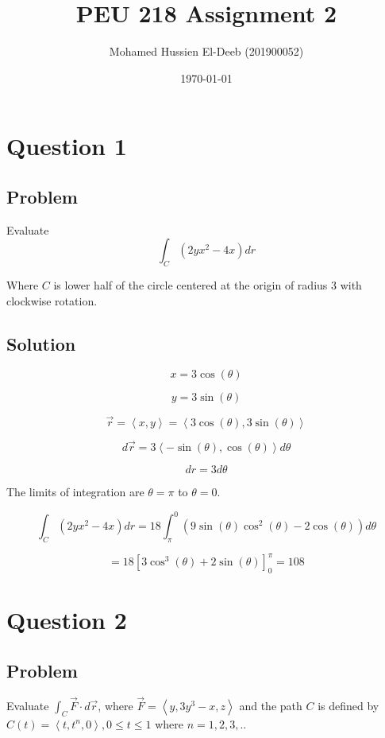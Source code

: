 \documentclass[12pt]{article}
\title{PEU 218 Assignment 2}
\author{Mohamed Hussien El-Deeb (201900052)}
\date{\today}
\begin{document}
\maketitle
\tableofcontents
\hypersetup{linkcolor=RoyalBlue4}

\newpage
\section{Question 1}

\subsection{Problem}

Evaluate
\[
    \int_C \left(2y x^2 - 4x\right) d r
\]

Where \(C\) is lower half of the circle centered at the origin of radius 3 with clockwise
rotation.

\subsection{Solution}

\[x = 3 \cos(\theta)\]

\[y = 3 \sin(\theta)\]

\[
    \vec{r} = \left\langle x, y\right\rangle =
    \left\langle 3 \cos(\theta), 3 \sin(\theta)\right\rangle
\]

\[
    d \vec{r} = 3 \left\langle -\sin(\theta), \cos(\theta)\right\rangle d\theta
\]

\[
    d r = 3 d \theta
\]



The limits of integration are \(\theta = \pi \) to \(\theta = 0\).

\[
    \int_C \left(2y x^2 - 4x\right) d r
    = 18 \int_{\pi}^{0} \left(9 \sin(\theta) \cos^2(\theta) - 2 \cos(\theta)\right) d \theta
\]

\[
    = 18 {\left[3 \cos^3(\theta) + 2 \sin(\theta)\right]}_{0}^{\pi}
    = 108
\]

\newpage
\section{Question 2}

\subsection{Problem}

Evaluate \(\int_C \vec{F} \cdot d \vec{r}\), where
\(\vec{F}=\left\langle y, 3y^3 - x, z\right\rangle \) and the path \(C\) is defined by
\(C(t) = \left\langle t, t^n, 0\right\rangle, 0 \leq t \leq 1\) where \(n = 1, 2, 3, .. \)
\end{document}
